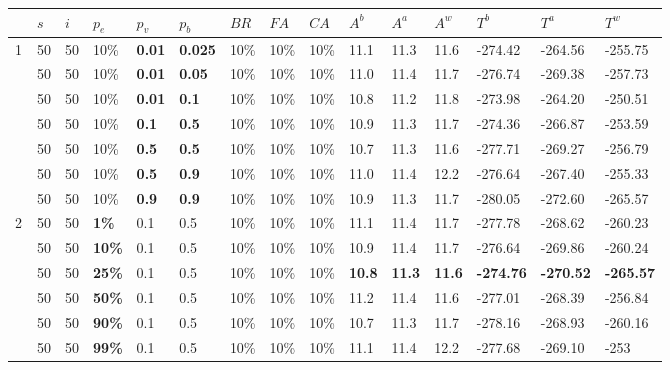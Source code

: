 \begin{table}
    \tiny
    \hspace*{-1.5cm}
	\begin{tabular}{|l|l|l|l|l|l|l|l|l||l|l|l|l|l|l|}
 	\hline
 	~ & $s$ & $i$ & $p_{e}$ & $p_{v}$ & $p_{b}$ & $BR$ & $FA$ & $CA$ & $A^b$ & $A^a$ & $A^w$ & $T^b$ & $T^a$ & $T^w$\\
 	\hline
    1 & 50 & 50 & 10\% & \textbf{0.01} & \textbf{0.025} & 10\% & 10\% & 10\% & 11.1 & 11.3 & 11.6 & -274.42 & -264.56 & -255.75 \\
    ~ & 50 & 50 & 10\% & \textbf{0.01} & \textbf{0.05} & 10\% & 10\% & 10\% & 11.0 & 11.4 & 11.7 & -276.74 & -269.38 & -257.73 \\
    ~ & 50 & 50 & 10\% & \textbf{0.01} & \textbf{0.1} & 10\% & 10\% & 10\% & 10.8 & 11.2 & 11.8 & -273.98 & -264.20 & -250.51 \\
    ~ & 50 & 50 & 10\% & \textbf{0.1} & \textbf{0.5} & 10\% & 10\% & 10\% & 10.9 & 11.3 & 11.7 & -274.36 & -266.87 & -253.59 \\
    ~ & 50 & 50 & 10\% & \textbf{0.5} & \textbf{0.5} & 10\% & 10\% & 10\% & 10.7 & 11.3 & 11.6 & -277.71 & -269.27 & -256.79 \\
    ~ & 50 & 50 & 10\% & \textbf{0.5} & \textbf{0.9} & 10\% & 10\% & 10\% & 11.0 & 11.4 & 12.2 & -276.64 & -267.40 & -255.33 \\
    ~ & 50 & 50 & 10\% & \textbf{0.9} & \textbf{0.9} & 10\% & 10\% & 10\% & 10.9 & 11.3 & 11.7 & -280.05 & -272.60 & -265.57 \\
    \hline
    2 & 50 & 50 & \textbf{1\%} & 0.1 & 0.5 & 10\% & 10\% & 10\% & 11.1 & 11.4 & 11.7 & -277.78 & -268.62 & -260.23 \\
    ~ & 50 & 50 & \textbf{10\%} & 0.1 & 0.5 & 10\% & 10\% & 10\% & 10.9 & 11.4 & 11.7 & -276.64 & -269.86 & -260.24 \\
    ~ & 50 & 50 & \textbf{25\%} & 0.1 & 0.5 & 10\% & 10\% & 10\% & \textbf{10.8} & \textbf{11.3} & \textbf{11.6} & \textbf{-274.76} & \textbf{-270.52} & \textbf{-265.57} \\
    ~ & 50 & 50 & \textbf{50\%} & 0.1 & 0.5 & 10\% & 10\% & 10\% & 11.2 & 11.4 & 11.6 & -277.01 & -268.39 & -256.84 \\
    ~ & 50 & 50 & \textbf{90\%} & 0.1 & 0.5 & 10\% & 10\% & 10\% & 10.7 & 11.3 & 11.7 & -278.16 & -268.93 & -260.16 \\
    ~ & 50 & 50 & \textbf{99\%} & 0.1 & 0.5 & 10\% & 10\% & 10\% & 11.1 & 11.4 & 12.2 & -277.68 & -269.10 & -253 \\

\end{tabular}
\end{table}
